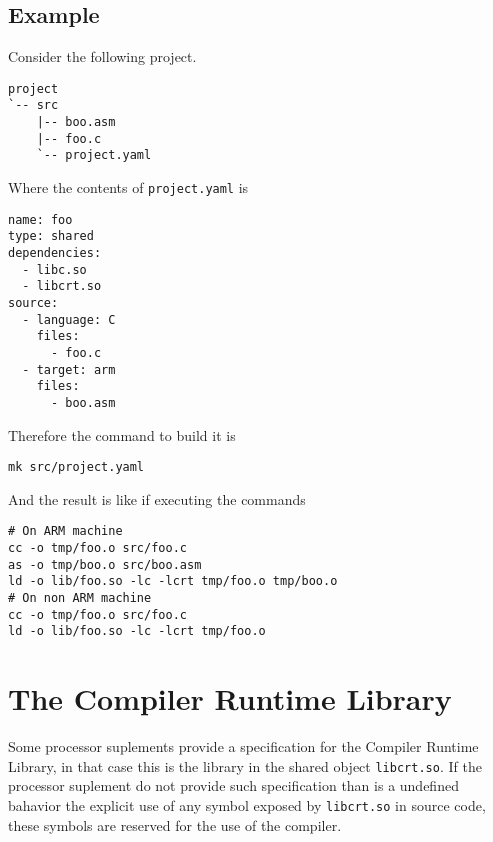 \documentclass[
   article,                      %
   10pt,                         %
   openright,                    %
   oneside,                      %
   a4paper,                      %
   sumario = tradicional,        %
   english,                      %
   xcolor=table                  %
]{abntex2}
\begin{document}
\subsection{Example}

Consider the following project.

\begin{lstlisting}
project
`-- src
    |-- boo.asm
    |-- foo.c
    `-- project.yaml
\end{lstlisting}

Where the contents of \texttt{project.yaml} is

\begin{lstlisting}[style=yaml]
name: foo
type: shared
dependencies:
  - libc.so
  - libcrt.so
source:
  - language: C
    files:
      - foo.c
  - target: arm
    files:
      - boo.asm
\end{lstlisting}

\noindent
Therefore the command to build it is

\begin{lstlisting}[style=bash]
mk src/project.yaml
\end{lstlisting}

\noindent
And the result is like if executing the commands

\begin{lstlisting}[style=bash]
# On ARM machine
cc -o tmp/foo.o src/foo.c
as -o tmp/boo.o src/boo.asm
ld -o lib/foo.so -lc -lcrt tmp/foo.o tmp/boo.o
# On non ARM machine
cc -o tmp/foo.o src/foo.c
ld -o lib/foo.so -lc -lcrt tmp/foo.o
\end{lstlisting}


   \postextual
   
   \apendices
   \renewcommand{\thesection}{\Alph{section}}


\section{The Compiler Runtime Library}

Some processor suplements provide a specification for the
Compiler Runtime Library, in that case this is the library in the shared
object \texttt{libcrt.so}.
If the processor suplement do not provide such specification than
is a undefined bahavior the explicit use of
any symbol exposed by \texttt{libcrt.so} in source code,
these symbols are reserved for the use of the compiler.
\end{document}
